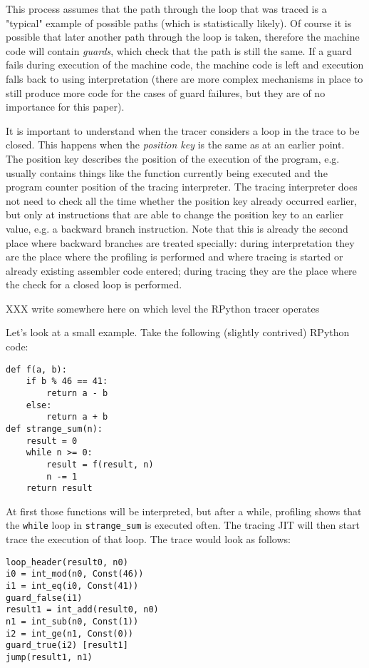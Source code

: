 \documentclass{acm_proc_article-sp}
\begin{document}
This process assumes that the path through the loop that was traced is a
"typical" example of possible paths (which is statistically likely). Of course
it is possible that later another path through the loop is taken, therefore the
machine code will contain \emph{guards}, which check that the path is still the same.
If a guard fails during execution of the machine code, the machine code is left
and execution falls back to using interpretation (there are more complex
mechanisms in place to still produce more code for the cases of guard failures,
but they are of no importance for this paper).

It is important to understand when the tracer considers a loop in the trace to
be closed. This happens when the \emph{position key} is the same as at an earlier
point. The position key describes the position of the execution of the program,
e.g. usually contains things like the function currently being executed and the
program counter position of the tracing interpreter. The tracing interpreter
does not need to check all the time whether the position key already occurred
earlier, but only at instructions that are able to change the position key
to an earlier value, e.g. a backward branch instruction. Note that this is
already the second place where backward branches are treated specially: during
interpretation they are the place where the profiling is performed and where
tracing is started or already existing assembler code entered; during tracing
they are the place where the check for a closed loop is performed.

XXX write somewhere here on which level the RPython tracer operates

Let's look at a small example. Take the following (slightly contrived) RPython
code:
\begin{verbatim}
def f(a, b):
    if b % 46 == 41:
        return a - b
    else:
        return a + b
def strange_sum(n):
    result = 0
    while n >= 0:
        result = f(result, n)
        n -= 1
    return result
\end{verbatim}

At first those functions will be interpreted, but after a while, profiling shows
that the \texttt{while} loop in \texttt{strange\_sum} is executed often.  The
tracing JIT will then start trace the execution of that loop.  The trace would
look as follows:
\begin{verbatim}
loop_header(result0, n0)
i0 = int_mod(n0, Const(46))
i1 = int_eq(i0, Const(41))
guard_false(i1)
result1 = int_add(result0, n0)
n1 = int_sub(n0, Const(1))
i2 = int_ge(n1, Const(0))
guard_true(i2) [result1]
jump(result1, n1)
\end{verbatim}
\end{document}
